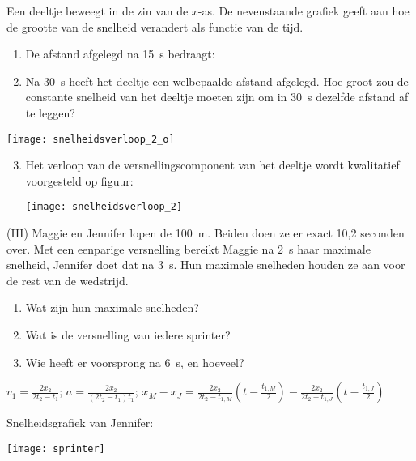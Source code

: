 \documentclass{ximera}
\begin{document}
\begin{exercise}
Een deeltje beweegt in de zin van de $x$-as. De nevenstaande grafiek geeft aan hoe de grootte van de snelheid verandert als functie van de tijd.
\begin{enumerate}
\item De afstand afgelegd na \SI{15}{s} bedraagt:

\item Na \SI{30}{s} heeft het deeltje een welbepaalde afstand afgelegd. Hoe groot zou de constante snelheid van het deeltje moeten zijn om in \SI{30}{s} dezelfde afstand af te leggen?

\end{enumerate}
\begin{image}
    \texttt{[image: snelheidsverloop\_2\_o]}
\end{image}
\begin{enumerate}
\setcounter{enumii}{2}
\item Het verloop van de versnellingscomponent van het deeltje wordt kwalitatief voorgesteld op figuur:
\begin{image}
    \texttt{[image: snelheidsverloop\_2]}
\end{image}
\end{enumerate}
\end{exercise}

\begin{exercise}
    (III) Maggie en Jennifer lopen de \SI{100}{m}. Beiden doen ze er exact 10,2 se\-conden over. Met een eenparige versnelling bereikt Maggie na \SI{2}{s} haar maximale snelheid, Jennifer doet dat na \SI{3}{s}. Hun maximale snelheden houden ze aan voor de rest van de wedstrijd.
    \begin{enumerate}
        \item Wat zijn hun maximale snelheden?
        \item Wat is de versnelling van iedere sprinter?
        \item Wie heeft er voorsprong na \SI{6}{s}, en hoeveel?
    \end{enumerate}
    \begin{oplossing}
        $v_1=\frac{2x_2}{2t_2-t_1}$;
        $a=\frac{2x_2}{(2t_2-t_1)t_1}$;
        $x_M-x_J=\frac{2x_2}{2t_2-t_{1,M}}(t-\frac{t_{1,M}}{2})-\frac{2x_2}{2t_2-t_{1,J}}(t-\frac{t_{1,J}}{2})$
        
        Snelheidsgrafiek van Jennifer:
        \begin{image}
            \texttt{[image: sprinter]}
        \end{image}
    \end{oplossing}
\end{exercise}
\end{document}
